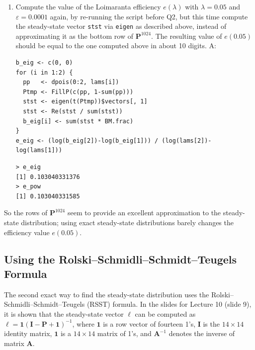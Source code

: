 \documentclass{article}
\begin{document}
\begin{enumerate}
  \item [$\boldsymbol{Q}_3$] Compute the value of the Loimaranta efficiency $e(\lambda)$ with $\lambda = 0.05$ and $\varepsilon = 0.0001$ again, by re-running the script before Q2, but this time compute the steady-state vector \texttt{stst} via \texttt{eigen} as described above, instead of approximating it as the bottom row of $\mathbf{P}^{1024}$. The resulting value of $e(0.05)$ should be equal to the one computed above in about 10 digits. \newline
  A:
\begin{lstlisting}
b_eig <- c(0, 0)
for (i in 1:2) {
  pp   <- dpois(0:2, lams[i])
  Ptmp <- FillP(c(pp, 1-sum(pp)))
  stst <- eigen(t(Ptmp))$vectors[, 1]
  stst <- Re(stst / sum(stst))
  b_eig[i] <- sum(stst * BM.frac)
}
e_eig <- (log(b_eig[2])-log(b_eig[1])) / (log(lams[2])-log(lams[1]))
\end{lstlisting}
\begin{lstlisting}
> e_eig
[1] 0.103040331376
> e_pow
[1] 0.103040331585  
\end{lstlisting}
\end{enumerate}
\clearpage
So the rows of $\mathbf{P}^{1024}$ seem to provide an excellent approximation to the steady-state distribution; using exact steady-state distributions barely changes the efficiency value $e(0.05)$.
\subsection{Using the Rolski--Schmidli--Schmidt--Teugels Formula}
 
The second exact way to find the steady-state distribution uses the Rolski--Schmidli--Schmidt--Teugels (RSST) formula. In the slides for Lecture 10 (slide 9), it is shown that the steady-state vector $\ell$ can be computed as $\ell = \mathbf{1}(\mathbf{I} - \mathbf{P} + \mathbf{1})^{-1}$, where $\mathbf{1}$ is a row vector of fourteen 1's, $\mathbf{I}$ is the $14 \times 14$ identity matrix, $\mathbf{1}$ is a $14 \times 14$ matrix of 1's, and $\mathbf{A}^{-1}$ denotes the inverse of matrix $\mathbf{A}$.
 
\end{document}
